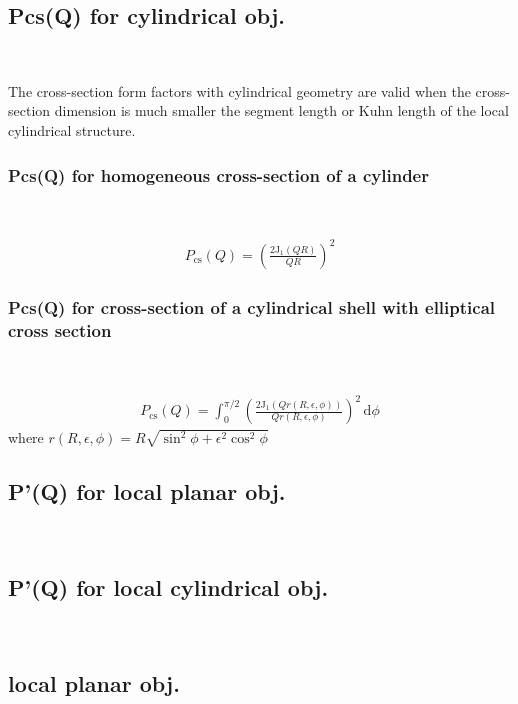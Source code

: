 \clearpage
\subsection{Pcs(Q) for cylindrical obj.} ~\\
\label{plugin:Pcs4cylindrical}

The cross-section form factors with cylindrical geometry are valid
when the cross-section dimension is much smaller the segment length
or Kuhn length of the local cylindrical structure.

\clearpage
\subsubsection{Pcs(Q) for homogeneous cross-section of a cylinder} ~\\
\label{plugin:Pcs:homogeneousXS_cyl}

\begin{align}
P_\textrm{cs}(Q) = \left( \frac{2 \mathrm{J}_1(QR)}{QR} \right)^2
\end{align}

\subsubsection{Pcs(Q) for cross-section of a cylindrical shell with elliptical cross section} ~\\
\label{plugin:Pcs:CylEllSh}

\begin{align}
P_\textrm{cs}(Q) = \int_0^{\pi/2} \left( \frac{2 \mathrm{J}_1(Qr(R,\epsilon,\phi))}{Qr(R,\epsilon,\phi)} \right)^2 \, \mathrm{d}\phi
\end{align}
where $r(R,\epsilon,\phi)=R\sqrt{\sin^2\phi+\epsilon^2\cos^2\phi}$
\clearpage
\subsection{P'(Q) for local planar obj.} ~\\
\label{plugin:Pprime4planar}


\subsection{P'(Q) for local cylindrical obj.} ~\\
\label{plugin:Pprime4cylindrical}

\subsection{local planar  obj.} ~\\
\label{plugin:LocalPlanar)}

